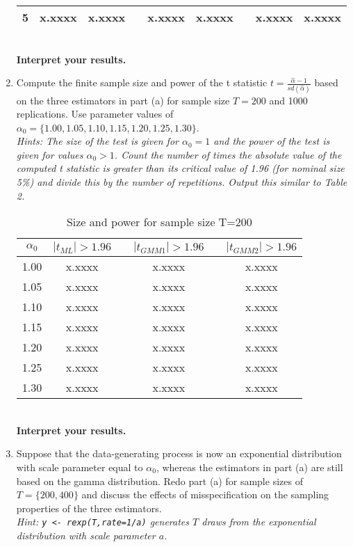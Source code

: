 \documentclass{article}
\begin{document}
\begin{enumerate}[label=(\alph*)]
\begin{table}[h]
\begin{tabular}{ccccccccc}
5          & x.xxxx             & x.xxxx             && x.xxxx              & x.xxxx              && x.xxxx              & x.xxxx              \\
\bottomrule
\end{tabular}
\end{table}\\
\textbf{Interpret your results.}
\item Compute the finite sample size and power of the t statistic $t=\frac{\hat{\alpha}-1}{sd(\hat{\alpha})}$ based on the three estimators in part (a) for sample size $T=200$ and 1000 replications. Use parameter values of $\alpha_0=\{1.00,1.05,1.10,1.15,1.20,1.25,1.30\}$.\\
    \emph{Hints: The size of the test is given for $\alpha_0=1$ and the power of the test is given for values $\alpha_0>1$. Count the number of times the absolute value of the computed t statistic is greater than its critical value of 1.96 (for nominal size 5\%) and divide this by the number of repetitions. Output this similar to Table 2.}
\begin{table}[h]
\centering
\caption{Size and power for sample size T=200}
\begin{tabular}{cccccc}
\toprule
$\alpha_0$    & $|t_{ML}|>1.96$ && $|t_{GMM1}|>1.96$ && $|t_{GMM2}|>1.96$ \\\midrule
1.00          & x.xxxx   && x.xxxx     && x.xxxx\\
1.05          & x.xxxx   && x.xxxx     && x.xxxx\\
1.10          & x.xxxx   && x.xxxx     && x.xxxx\\
1.15          & x.xxxx   && x.xxxx     && x.xxxx\\
1.20          & x.xxxx   && x.xxxx     && x.xxxx\\
1.25          & x.xxxx   && x.xxxx     && x.xxxx\\
1.30          & x.xxxx   && x.xxxx     && x.xxxx\\
\bottomrule
\end{tabular}
\end{table}\\
\textbf{Interpret your results.}
\item Suppose that the data-generating process is now an exponential distribution with scale parameter equal to $\alpha_0$, whereas the estimators in part (a) are still based on the gamma distribution. Redo part (a) for sample sizes of $T=\{200,400\}$ and discuss the effects of misspecification on the sampling properties of the three estimators.\\
    \emph{Hint: \texttt{y <- rexp(T,rate=1/a)} generates $T$ draws from the exponential distribution with scale parameter $a$.}
\end{enumerate}
\end{document}
